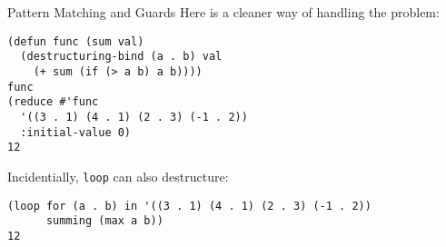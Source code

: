 \documentclass[presentation]{beamer}
\begin{document}
\begin{frame}[fragile]{Pattern Matching and Guards}
  Here is a cleaner way of handling the problem:
\begin{verbatim}
(defun func (sum val)
  (destructuring-bind (a . b) val
    (+ sum (if (> a b) a b))))
func
(reduce #'func
  '((3 . 1) (4 . 1) (2 . 3) (-1 . 2))
  :initial-value 0)
12
\end{verbatim}
\medskip
Incidentially, \texttt{loop} can also destructure:
\begin{verbatim}
(loop for (a . b) in '((3 . 1) (4 . 1) (2 . 3) (-1 . 2))
      summing (max a b))
12
\end{verbatim}

\end{frame}
\end{document}
